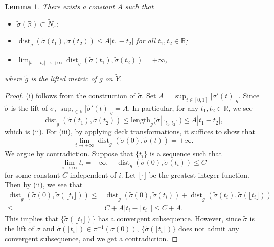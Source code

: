 \documentclass[11pt,letterpaper]{amsart}
\numberwithin{equation}{section}
\newtheorem{lemma}[theorem]{Lemma}
\theoremstyle{definition}
\DeclareMathOperator{\dist}{dist}
\newcommand{\ve}{\varepsilon}
\newcommand{\ti}[1]{\tilde{#1}}
\begin{document}
\begin{lemma}\label{geodesic}
There exists a constant $A$ such that
\begin{itemize}\setlength{\itemsep}{1mm}
\item[(i)] $\ti{\sigma}(\mathbb{R})\subset\ti N_{\ve}$;
\item[(ii)]

$\dist_{\ti{g}}(\ti{\sigma}(t_1),\ti{\sigma}(t_2)) \leq A|t_{1}-t_{2}|$ for all $t_{1},t_{2}\in\mathbb{R}$;
\item[(iii)]
$\lim_{|t_1-t_2|\to +\infty}\dist_{\ti{g}}(\ti{\sigma}(t_1),\ti{\sigma}(t_2))=+\infty$,
\end{itemize}
where $\ti g$ is the lifted metric of $g$ on $\ti Y$.
\end{lemma}
\begin{proof}
(i) follows from the construction of $\ti{\sigma}$. Set $A=\sup_{t\in[0,1]}|\sigma'(t)|_{g}$. Since $\ti{\sigma}$ is the lift of $\sigma$,  $\sup_{t\in\mathbb{R}}|\ti{\sigma}'(t)|_{\ti{g}}=A$. In particular, for any $t_{1},t_{2}\in\mathbb{R}$, we see
\[
\dist_{\ti{g}}(\ti{\sigma}(t_1),\ti{\sigma}(t_2))
\leq \mathrm{length}_{\ti{g}}(\ti{\sigma}|_{[t_{1},t_{2}]}) \leq A|t_{1}-t_{2}|,
\]
which is (ii). For (iii), by applying deck transformations, it suffices to show that
$$
\lim_{t\to +\infty}\dist_{\ti{g}}(\ti{\sigma}(0),\ti{\sigma}(t))=+\infty.
$$
We argue by contradiction. Suppose that $\{t_{i}\}$ is a sequence such that
\[
\lim_{i\rightarrow\infty}t_{i} = +\infty ,\quad \dist_{\ti{g}}(\ti{\sigma}(0),\ti{\sigma}(t_i)) \leq C
\]
for some constant $C$ independent of $i$. Let $\lfloor\cdot\rfloor$ be the greatest integer function. Then by (ii), we see that
\[
\begin{split}
\dist_{\ti{g}}(\ti{\sigma}(0),\ti{\sigma}(\lfloor t_i\rfloor))
\leq {} & \dist_{\ti{g}}(\ti{\sigma}(0),\ti{\sigma}(t_i))+\dist_{\ti{g}}(\ti{\sigma}(t_{i}),\ti{\sigma}(\lfloor t_i\rfloor)) \\
\leq {} & C+A|t_{i}-\lfloor t_{i}\rfloor| \leq C+A.
\end{split}
\]
This implies that $\{\ti{\sigma}(\lfloor t_i\rfloor)\}$ has a convergent subsequence. However, since $\ti \sigma$ is the lift of $\sigma$ and $\ti{\sigma}(\lfloor t_i\rfloor)\in\pi^{-1}(\sigma(0))$, $\{\ti{\sigma}(\lfloor t_i\rfloor)\}$ does not admit any convergent subsequence, and we get a contradiction.
\end{proof}
\end{document}
